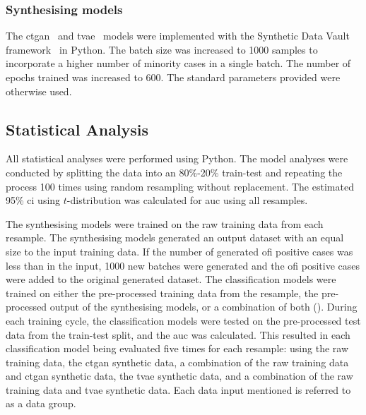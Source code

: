 \documentclass[12pt, a4paper]{article}
\begin{document}
\subsubsection*{Synthesising models}
The \acrfull{ctgan}~\cite{xu_modeling_2019} and \acrfull{tvae}~\cite{ishfaq_tvae_2018} models were implemented with the
Synthetic Data Vault framework~\cite{patki_sdv_2016} in Python. The batch size was increased to 1000 samples to
incorporate a higher number of minority cases in a single batch. The number of epochs trained was increased to 600.
The standard parameters provided were otherwise used.

\subsection{Statistical Analysis}
All statistical analyses were performed using Python. The model analyses were conducted by splitting the data into an
80\%-20\% train-test and repeating the process 100 times using random resampling without replacement. The estimated
95\% \acrfull{ci} using $t$-distribution was calculated for \acrfull{auc} using all resamples.

The synthesising models were trained on the raw training data from each resample. The synthesising models generated an
output dataset with an equal size to the input training data. If the number of generated \acrshort{ofi} positive cases
was less than in the input, 1000 new batches were generated and the \acrshort{ofi} positive cases were added to the
original generated dataset. The classification models were trained on either the pre-processed training data from the
resample, the pre-processed output of the synthesising models, or a combination of both ().
During each training cycle, the classification models were tested on the pre-processed test data from the train-test
split, and the \acrshort{auc} was calculated. This resulted in each classification model being evaluated five times for
each resample: using the raw training data, the \acrshort{ctgan} synthetic data, a combination of the raw training data
and \acrshort{ctgan} synthetic data, the \acrshort{tvae} synthetic data, and a combination of the raw training data and
\acrshort{tvae} synthetic data. Each data input mentioned is referred to as a data group.
\end{document}
